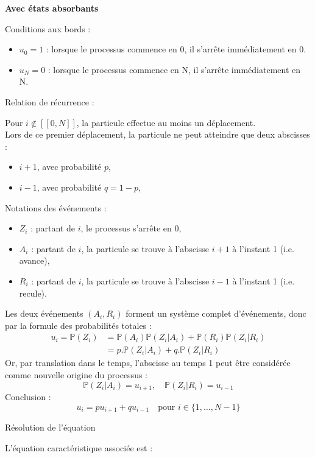 \documentclass[10pt,a4paper]{article}
\begin{document}
\bigskip

\textbf{Avec états absorbants}

\q Conditions aux bords :

\begin{itemize}
\item $u_0 = 1$ : lorsque le processus commence en 0, il s'arrête immédiatement en 0.
\item $u_N = 0$ : lorsque le processus commence en N, il s'arrête immédiatement en N.
\end{itemize}

\q Relation de récurrence :

Pour $i \notin [[ 0, N ]]$, la particule effectue au moins un déplacement. \\
Lors de ce premier déplacement, la particule ne peut atteindre que deux abscisses :
\begin{itemize}
 \item $i+1$, avec probabilité $p$,
 \item $i-1$, avec probabilité $q = 1-p$,
\end{itemize}
Notations des événements :
\begin{itemize}
 \item $Z_i$ : partant de $i$, le processus s'arrête en 0,
 \item $A_i$ : partant de $i$, la particule se trouve à l'abscisse $i+1$ à l'instant 1 (i.e. avance),
 \item $R_i$ : partant de $i$, la particule se trouve à l'abscisse $i-1$ à l'instant 1 (i.e. recule).
\end{itemize}

Les deux événements $(A_i, R_i)$ forment un système complet d'événements, donc par la formule des
probabilités totales :
\[
\begin{aligned}
   u_i = \mathbb{P}(Z_i) & = \mathbb{P}(A_i)\mathbb{P}(Z_i|A_i) + \mathbb{P}(R_i)\mathbb{P}(Z_i|R_i) \\
  & = p.\mathbb{P}(Z_i|A_i) + q.\mathbb{P}(Z_i|R_i)
\end{aligned}
\]
Or, par translation dans le temps, l'abscisse au temps 1 peut être considérée comme nouvelle origine
du processus :
\[
\mathbb{P}(Z_i|A_i) = u_{i+1}, \quad \mathbb{P}(Z_i|R_i) = u_{i-1}
\]
Conclusion :
\[
\boxed{u_i = p u_{i+1} + q u_{i-1} \quad \text{pour } i \in \{1, \dots, N-1\}}
\]

\q Résolution de l'équation

L'équation caractéristique associée est :
\end{document}
